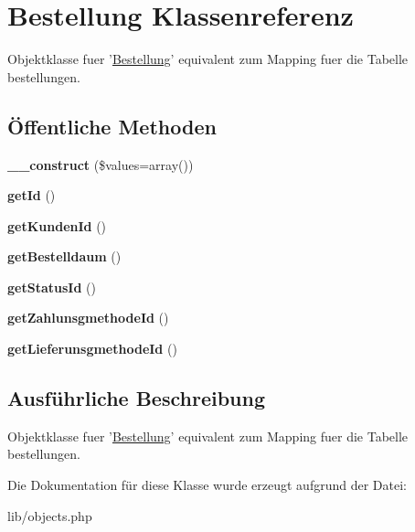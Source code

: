 \hypertarget{classBestellung}{\section{\-Bestellung \-Klassenreferenz}
\label{classBestellung}
}


\-Objektklasse fuer '\hyperlink{classBestellung}{\-Bestellung}' equivalent zum \-Mapping fuer die \-Tabelle bestellungen.  


\subsection*{Öffentliche \-Methoden}
\begin{DoxyCompactItemize}
\item 
\hypertarget{classBestellung_a2a2fb909389e1336f8cb87a2a3126c39}{{\bfseries \-\_\-\-\_\-construct} (\$values=array())}\label{classBestellung_a2a2fb909389e1336f8cb87a2a3126c39}

\item 
\hypertarget{classBestellung_ac433ecde97ce5cd8d0b7fc1884af9c87}{{\bfseries get\-Id} ()}\label{classBestellung_ac433ecde97ce5cd8d0b7fc1884af9c87}

\item 
\hypertarget{classBestellung_a3be08a9bfeca49713a00f76585b5a7ce}{{\bfseries get\-Kunden\-Id} ()}\label{classBestellung_a3be08a9bfeca49713a00f76585b5a7ce}

\item 
\hypertarget{classBestellung_aef3ff01fd39f0249c8bc379695f95db6}{{\bfseries get\-Bestelldaum} ()}\label{classBestellung_aef3ff01fd39f0249c8bc379695f95db6}

\item 
\hypertarget{classBestellung_a2231a535ab51190d52fd5a89843109e8}{{\bfseries get\-Status\-Id} ()}\label{classBestellung_a2231a535ab51190d52fd5a89843109e8}

\item 
\hypertarget{classBestellung_af3cac1bf22f8c5fb882bde3fc11ae3b1}{{\bfseries get\-Zahlunsgmethode\-Id} ()}\label{classBestellung_af3cac1bf22f8c5fb882bde3fc11ae3b1}

\item 
\hypertarget{classBestellung_a7a11cefdae3ace84e9eb09bd5afe31e8}{{\bfseries get\-Lieferunsgmethode\-Id} ()}\label{classBestellung_a7a11cefdae3ace84e9eb09bd5afe31e8}

\end{DoxyCompactItemize}


\subsection{\-Ausführliche \-Beschreibung}
\-Objektklasse fuer '\hyperlink{classBestellung}{\-Bestellung}' equivalent zum \-Mapping fuer die \-Tabelle bestellungen. 

\-Die \-Dokumentation für diese \-Klasse wurde erzeugt aufgrund der \-Datei\-:\begin{DoxyCompactItemize}
\item 
lib/objects.\-php\end{DoxyCompactItemize}
